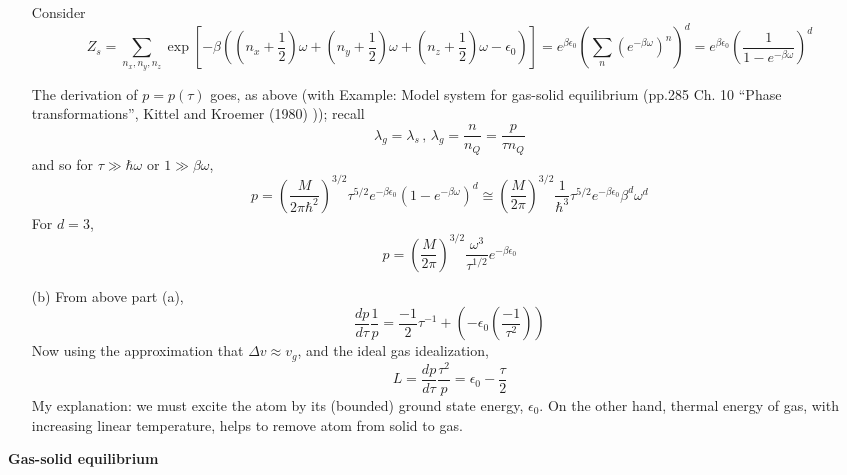 \documentclass[twoside]{amsart}
\theoremstyle{plain}
\theoremstyle{definition}
\newcommand{\problemhead}[1]
  {
   \noindent{\small\bf Problem #1.}
   }
\begin{document}
\begin{enumerate}
Consider 
\[
Z_s = \sum_{n_x,n_y,n_z} \exp{ \left[ - \beta((n_x + \frac{1}{2} )\omega + (n_y + \frac{1}{2}) \omega + (n_z + \frac{1}{2} )\omega -\epsilon_0 ) \right] } = e^{\beta \epsilon_0} \left( \sum_n (e^{-\beta \omega })^n \right)^d = e^{\beta \epsilon_0} \left( \frac{1}{ 1 - e^{-\beta \omega } } \right)^d
\]

The derivation of $p = p(\tau)$ goes, as above (with Example: Model system for gas-solid equilibrium (pp.285 Ch. 10 ``Phase transformations'', Kittel and Kroemer (1980) \cite{CKittelHKroemer1980})); recall
\[
\lambda_g = \lambda_s \, ,  \, \lambda_g = \frac{n}{n_Q} = \frac{p}{\tau n_Q}
\]
and so for $\tau \gg \hbar \omega$ or $1 \gg \beta \omega$, 
\[
p = \left( \frac{M}{2\pi \hbar^2} \right)^{3/2} \tau^{5/2} e^{-\beta \epsilon_0}(1- e^{-\beta \omega} )^d \cong \left( \frac{M}{2\pi } \right)^{3/2} \frac{1}{\hbar^3} \tau^{5/2} e^{-\beta \epsilon_0} \beta^d \omega^d
\]
For $d=3$,
\[
\boxed{ p = \left( \frac{M}{2\pi }\right)^{3/2} \frac{\omega^3}{\tau^{1/2}} e^{-\beta \epsilon_0} }
\]



\item[(b)] 
From above part (a),
\[
\frac{dp}{d\tau}\frac{1}{p} = \frac{-1}{2} \tau^{-1} + (-\epsilon_0 \left( \frac{-1}{\tau^2} \right) )
\]
Now using the approximation that $\Delta v \approx v_g$, and the ideal gas idealization,
\[
L = \frac{dp}{d\tau} \frac{\tau^2}{p} = \epsilon_0 - \frac{\tau}{2}
\]
My explanation: we must excite the atom by its (bounded) ground state energy, $\epsilon_0$.  On the other hand, thermal energy of gas, with increasing linear temperature, helps to remove atom from solid to gas.  
\end{enumerate} 


\problemhead{5} \textbf{Gas-solid equilibrium}
\end{document}
